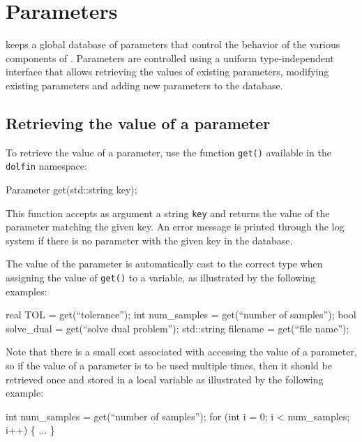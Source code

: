 \chapter{Parameters}
\label{sec:parameters}


\dolfin{} keeps a global database of parameters that control the
behavior of the various components of \dolfin{}. Parameters are
controlled using a uniform type-independent interface that allows
retrieving the values of existing parameters, modifying existing
parameters and adding new parameters to the database.

\section{Retrieving the value of a parameter}

To retrieve the value of a parameter, use the function \texttt{get()}
available in the \texttt{dolfin} namespace:
\begin{code}
  Parameter get(std::string key);
\end{code}
This function accepts as argument a string \texttt{key} and returns
the value of the parameter matching the given key. An error message is
printed through the log system if there is no parameter with the given
key in the database.

The value of the parameter is automatically cast to the correct type
when assigning the value of \texttt{get()} to a variable, as
illustrated by the following examples:
\begin{code}
  real TOL = get(``tolerance'');
  int num_samples = get(``number of samples'');
  bool solve_dual = get(``solve dual problem'');
  std::string filename = get(``file name'');
\end{code}

Note that there is a small cost associated with accessing the value of
a parameter, so if the value of a parameter is to be used multiple
times, then it should be retrieved once and stored in a local variable
as illustrated by the following example:
\begin{code}
  int num_samples = get(``number of samples'');
  for (int i = 0; i < num_samples; i++)
  \{
    ...
  \}
\end{code}

